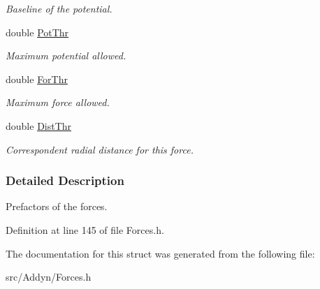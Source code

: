 \begin{DoxyCompactItemize}
\begin{DoxyCompactList}\small\item\em \-Baseline of the potential. \end{DoxyCompactList}\item 
\hypertarget{structKFORCES_adf3d7e8b11ee1fa9f6b7b58141ab5112}{double \hyperlink{structKFORCES_adf3d7e8b11ee1fa9f6b7b58141ab5112}{\-Pot\-Thr}}\label{structKFORCES_adf3d7e8b11ee1fa9f6b7b58141ab5112}

\begin{DoxyCompactList}\small\item\em \-Maximum potential allowed. \end{DoxyCompactList}\item 
\hypertarget{structKFORCES_ad631a0b43047f95f5bb991f5407b813e}{double \hyperlink{structKFORCES_ad631a0b43047f95f5bb991f5407b813e}{\-For\-Thr}}\label{structKFORCES_ad631a0b43047f95f5bb991f5407b813e}

\begin{DoxyCompactList}\small\item\em \-Maximum force allowed. \end{DoxyCompactList}\item 
\hypertarget{structKFORCES_a7be87fae5fde1648d34b194775515d08}{double \hyperlink{structKFORCES_a7be87fae5fde1648d34b194775515d08}{\-Dist\-Thr}}\label{structKFORCES_a7be87fae5fde1648d34b194775515d08}

\begin{DoxyCompactList}\small\item\em \-Correspondent radial distance for this force. \end{DoxyCompactList}\end{DoxyCompactItemize}


\subsubsection{\-Detailed \-Description}
\-Prefactors of the forces. 

\-Definition at line 145 of file \-Forces.\-h.



\-The documentation for this struct was generated from the following file\-:\begin{DoxyCompactItemize}
\item 
src/\-Addyn/\-Forces.\-h\end{DoxyCompactItemize}
